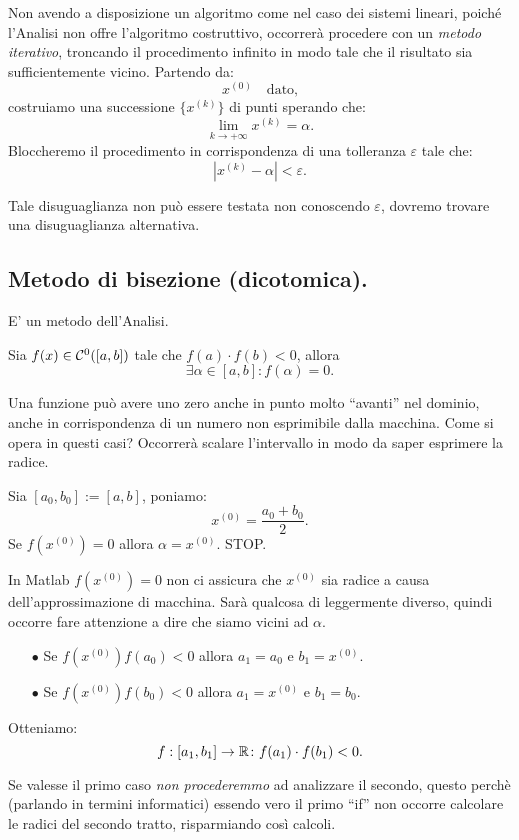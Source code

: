 Non avendo a disposizione un algoritmo come nel caso dei sistemi lineari,
poiché l'Analisi non offre l'algoritmo costruttivo, occorrerà procedere
con un \emph{metodo iterativo}, troncando il procedimento infinito in modo
tale che il risultato sia sufficientemente vicino. Partendo da:
\[
x^{(0)} \quad \textrm{dato,}
\]
costruiamo una successione $\{x^{(k)}\}$ di punti sperando che:
\[
\lim_{k \to +\infty}x^{(k)} = \alpha.
\]
Bloccheremo il procedimento in corrispondenza di una tolleranza $\varepsilon$
tale che:
\[
\left|x^{(k)} -\alpha\right| < \varepsilon.
\]
\begin{osse}
Tale disuguaglianza non può essere testata non conoscendo $\varepsilon$,
dovremo trovare una disuguaglianza alternativa.
\end{osse}

\subsection{Metodo di bisezione (dicotomica).}
E' un metodo dell'Analisi.
\begin{teo}
Sia $f(x) \in \mathcal{C}^0([a,b])$ tale che $f(a) \cdot f(b) < 0$, allora
\[\exists \alpha \in [a,b] \colon f(\alpha) = 0.\]
\end{teo}

\begin{notabene}
Una funzione può avere uno zero anche in punto molto ``avanti'' nel dominio,
anche in corrispondenza di un numero non esprimibile dalla macchina.
Come si opera in questi casi? Occorrerà scalare l'intervallo in modo da
saper esprimere la radice.
\end{notabene}

Sia $[a_0,b_0] := [a,b]$, poniamo:
\[x^{(0)} = \frac{a_0+b_0}{2}.\]
Se $f(x^{(0)}) = 0$ allora $\alpha = x^{(0)}$. STOP.
\begin{osse}
In Matlab $f(x^{(0)}) = 0$ non ci assicura che $x^{(0)}$ sia radice a causa 
dell'approssimazione di macchina. Sarà qualcosa di leggermente diverso, quindi
occorre fare attenzione a dire che siamo vicini ad $\alpha$.
\end{osse}
\begin{itemize}
\item[$\bullet$]Se $f(x^{(0)})f(a_0) < 0$ allora $a_1 = a_0$ e $b_1 = x^{(0)}$.
\item[$\bullet$]Se $f(x^{(0)})f(b_0) < 0$ allora $a_1 = x^{(0)}$ e $b_1 = b_0$.
\end{itemize}
Otteniamo:
\[f:[a_1,b_1] \to \mathbb{R} \colon f(a_1)\cdot f(b_1) < 0.\]
\begin{osse}
Se valesse il primo caso \emph{non procederemmo} ad analizzare il secondo, 
questo perchè (parlando in termini informatici) essendo vero il primo ``if''
non occorre calcolare le radici del secondo tratto, risparmiando così calcoli.
\end{osse}

